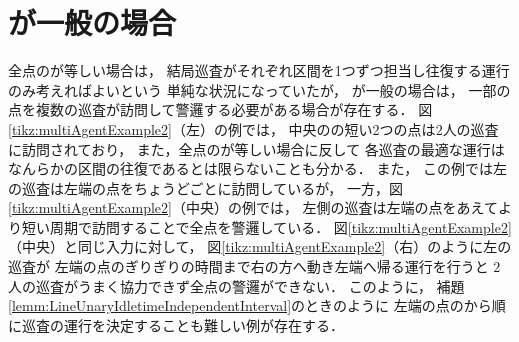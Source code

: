\section{{\maxIdletime}が一般の場合}
\label{section:LineArbitraryIdletime}

全点の{\maxIdletime}が等しい場合は，
結局巡査がそれぞれ区間を1つずつ担当し往復する運行のみ考えればよいという
単純な状況になっていたが，
{\maxIdletime}が一般の場合は，
一部の点を複数の巡査が訪問して警邏する必要がある場合が存在する．
%
図\ref{tikz:multiAgentExample2}（左）の例では，
中央の{\maxIdletime}の短い2つの点は$2$人の巡査に訪問されており，
また，全点の{\maxIdletime}が等しい場合に反して
各巡査の最適な運行はなんらかの区間の往復であるとは限らないことも分かる．
%
また，
この例では左の巡査は左端の点を{\maxIdletime}ちょうどごとに訪問しているが，
一方，図\ref{tikz:multiAgentExample2}（中央）の例では，
左側の巡査は左端の点をあえてより短い周期で訪問することで全点を警邏している．
図\ref{tikz:multiAgentExample2}（中央）と同じ入力に対して，
図\ref{tikz:multiAgentExample2}（右）のように左の巡査が
左端の点の{\maxIdletime}ぎりぎりの時間まで右の方へ動き左端へ帰る運行を行うと
$2$人の巡査がうまく協力できず全点の警邏ができない．
このように，
補題\ref{lemm:LineUnaryIdletimeIndependentInterval}のときのように
左端の点の{\maxIdletime}から順に巡査の運行を決定することも難しい例が存在する．

